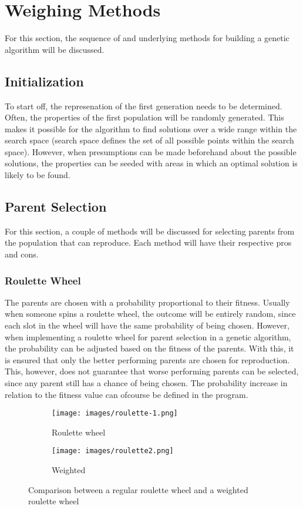 \documentclass{article}
\begin{document}
\newpage
\section{Weighing Methods}
For this section, the sequence of and underlying methods for building a genetic algorithm will be discussed. 
\bigskip

\subsection{Initialization}
To start off, the represenation of the first generation needs to be determined. Often, the properties of the first population will be randomly generated. This makes it possible for the algorithm to find solutions over a wide range within the search space (search space defines the set of all possible points within the search space). However, when presumptions can be made beforehand about the possible solutions, the properties can be seeded with areas in which an optimal solution is likely to be found.

\bigskip
\subsection{Parent Selection}
For this section, a couple of methods will be discussed for selecting parents from the population that can reproduce. Each method will have their respective pros and cons.

\subsubsection{Roulette Wheel}
The parents are chosen with a probability proportional to their fitness. Usually when someone spins a roulette wheel, the outcome will be entirely random, since each slot in the wheel will have the same probability of being chosen. However, when implementing a roulette wheel for parent selection in a genetic algorithm, the probability can be adjusted based on the fitness of the parents. With this, it is ensured that only the better performing parents are chosen for reproduction. This, however, does not guarantee that worse performing parents can be selected, since any parent still has a chance of being chosen. The probability increase in relation to the fitness value can ofcourse be defined in the program. 

\begin{figure}[h!]
    \centering
    \begin{subfigure}[b]{0.2\linewidth}
      \texttt{[image: images/roulette-1.png]}
      \caption{Roulette wheel}
    \end{subfigure}
    \begin{subfigure}[b]{0.2\linewidth}
      \texttt{[image: images/roulette2.png]}
      \caption{Weighted}
    \end{subfigure}
    \caption{Comparison between a regular roulette wheel and a weighted roulette wheel}
    \label{fig:roulette}
\end{figure}
\end{document}
